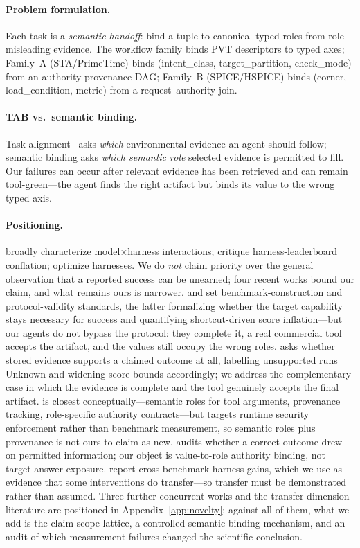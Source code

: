 \documentclass{article}
\begin{document}
\paragraph{Problem formulation.} Each task is a \emph{semantic handoff}: bind a tuple to canonical typed roles from role-misleading evidence. The workflow family binds PVT descriptors to typed axes; Family~A (STA/PrimeTime) binds (intent\_class, target\_partition, check\_mode) from an authority provenance DAG; Family~B (SPICE/HSPICE) binds (corner, load\_condition, metric) from a request--authority join.

\paragraph{TAB vs.\ semantic binding.} Task alignment~\citep{tab} asks \emph{which} environmental evidence an agent should follow; semantic binding asks \emph{which semantic role} selected evidence is permitted to fill. Our failures can occur after relevant evidence has been retrieved and can remain tool-green---the agent finds the right artifact but binds its value to the wrong typed axis.

\paragraph{Positioning.} \citet{harnessbench} broadly characterize model$\times$harness interactions; \citet{harnesseval} critique harness-leaderboard conflation; \citet{harnesso} optimize harnesses. We do \emph{not} claim priority over the general observation that a reported success can be unearned; four recent works bound our claim, and what remains ours is narrower. \citet{abc} and \citet{protocolval} set benchmark-construction and protocol-validity standards, the latter formalizing whether the target capability stays necessary for success and quantifying shortcut-driven score inflation---but our agents do not bypass the protocol: they complete it, a real commercial tool accepts the artifact, and the values still occupy the wrong roles. \citet{evidencebounds} asks whether stored evidence supports a claimed outcome at all, labelling unsupported runs Unknown and widening score bounds accordingly; we address the complementary case in which the evidence is complete and the tool genuinely accepts the final artifact. \citet{pact} is closest conceptually---semantic roles for tool arguments, provenance tracking, role-specific authority contracts---but targets runtime security enforcement rather than benchmark measurement, so semantic roles plus provenance is not ours to claim as new. \citet{successprov} audits whether a correct outcome drew on permitted information; our object is value-to-role authority binding, not target-answer exposure. \citet{longhorizon} report cross-benchmark harness gains, which we use as evidence that some interventions do transfer---so transfer must be demonstrated rather than assumed. Three further concurrent works and the transfer-dimension literature are positioned in Appendix~\ref{app:novelty}; against all of them, what we add is the claim-scope lattice, a controlled semantic-binding mechanism, and an audit of which measurement failures changed the scientific conclusion.
\end{document}

